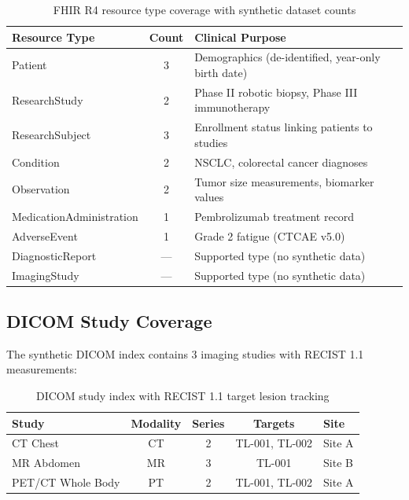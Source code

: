 \documentclass[10pt,letterpaper]{article}
\begin{document}
\begin{table}[H]
\centering
\caption{FHIR R4 resource type coverage with synthetic dataset counts}
\label{tab:fhirres}
\small
\begin{tabularx}{\textwidth}{l c X}
\toprule
\textbf{Resource Type} & \textbf{Count} & \textbf{Clinical Purpose} \\
\midrule
Patient & 3 & Demographics (de-identified, year-only birth date) \\
ResearchStudy & 2 & Phase II robotic biopsy, Phase III immunotherapy \\
ResearchSubject & 3 & Enrollment status linking patients to studies \\
Condition & 2 & NSCLC, colorectal cancer diagnoses \\
Observation & 2 & Tumor size measurements, biomarker values \\
MedicationAdministration & 1 & Pembrolizumab treatment record \\
AdverseEvent & 1 & Grade 2 fatigue (CTCAE v5.0) \\
DiagnosticReport & --- & Supported type (no synthetic data) \\
ImagingStudy & --- & Supported type (no synthetic data) \\
\bottomrule
\end{tabularx}
\end{table}

\subsection{DICOM Study Coverage}

The synthetic DICOM index contains 3 imaging studies with RECIST 1.1 measurements:

\begin{table}[H]
\centering
\caption{DICOM study index with RECIST 1.1 target lesion tracking}
\label{tab:dicomstudies}
\small
\begin{tabularx}{\textwidth}{l c c c X}
\toprule
\textbf{Study} & \textbf{Modality} & \textbf{Series} & \textbf{Targets} & \textbf{Site} \\
\midrule
CT Chest & CT & 2 & TL-001, TL-002 & Site A \\
MR Abdomen & MR & 3 & TL-001 & Site B \\
PET/CT Whole Body & PT & 2 & TL-001, TL-002 & Site A \\
\bottomrule
\end{tabularx}
\end{table}
\end{document}
